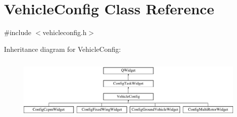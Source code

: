 \hypertarget{class_vehicle_config}{\section{Vehicle\-Config Class Reference}
\label{class_vehicle_config}
}


{\ttfamily \#include $<$vehicleconfig.\-h$>$}

Inheritance diagram for Vehicle\-Config\-:\begin{figure}[H]
\begin{center}
\leavevmode
\includegraphics[height=3.111111cm]{class_vehicle_config}
\end{center}
\end{figure}

